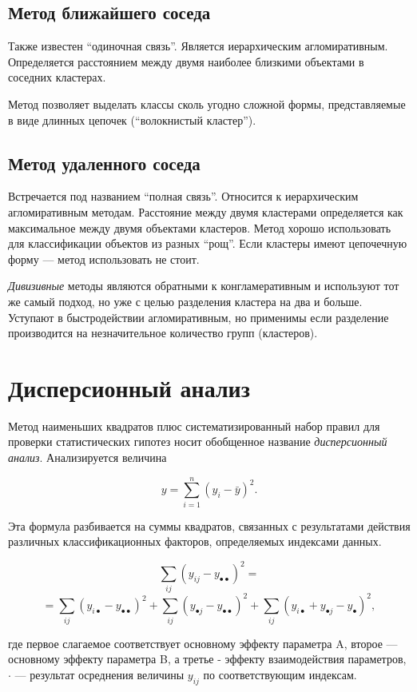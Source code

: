 \documentclass[12pt]{article}
\begin{document}
\subsection{Метод ближайшего соседа}
Также известен \enquote{одиночная связь}. Является иерархическим агломиративным. Определяется расстоянием между двумя наиболее близкими объектами в соседних кластерах.

Метод позволяет выделать классы сколь угодно сложной формы, представляемые в виде длинных цепочек (\enquote{волокнистый кластер}).

\subsection{Метод удаленного соседа}
Встречается под названием \enquote{полная связь}. Относится к иерархическим агломиративным методам. Расстояние между двумя кластерами определяется как максимальное между двумя объектами кластеров. Метод хорошо использовать для классификации объектов из разных \enquote{рощ}. Если кластеры имеют цепочечную форму --- метод использовать не стоит.

\emph{Дивизивные} методы являются обратными к конгламеративным и используют тот же самый подход, но уже с целью разделения кластера на два и больше. Уступают в быстродействии агломиративным, но применимы если разделение производится на незначительное количество групп (кластеров).

\newpage
\section{Дисперсионный анализ}
Метод наименьших квадратов плюс систематизированный набор правил для проверки статистических гипотез носит обобщенное название \emph{дисперсионный анализ}. Анализируется величина

\[ y = \sum_{i=1}^n \left(y_i - \bar{y} \right)^2.\]

Эта формула разбивается на суммы квадратов, связанных с результатами действия различных классификационных факторов, определяемых индексами данных.

\[ \sum_{ij} \left( y_{ij} - y_{\bullet \bullet } \right)^2 = \]
\[ = \sum_{ij} \left( y_{i\bullet } - y_{\bullet \bullet } \right)^2 + \sum_{ij} \left( y_{\bullet  j} - y_{\bullet \bullet } \right)^2 + \sum_{ij} \left( y_{i \bullet } + y_{\bullet j} - y_{\bullet } \right)^2, \]

где первое слагаемое соответствует основному эффекту параметра A, второе --- основному эффекту параметра B, а третье - эффекту взаимодействия параметров, $\cdot$ --- результат осреднения величины $y_{ij}$ по соответствующим индексам.
\end{document}
